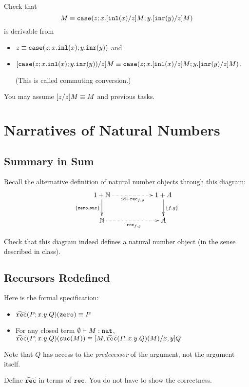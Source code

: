 \documentclass[12pt]{article}
\begin{document}
\begin{task}
  Check that
  \[
    M \equiv \mathtt{case}(z;x.[\mathtt{inl}(x)/z]M;y.[\mathtt{inr}(y)/z]M)
  \]
  is derivable from
  \begin{itemize}
    \item $z \equiv \mathtt{case}(z;x.\mathtt{inl}(x);y.\mathtt{inr}(y))$ and
    \item
      $[\mathtt{case}(z;x.\mathtt{inl}(x);y.\mathtt{inr}(y))/z]M \equiv \mathtt{case}(z;x.[\mathtt{inl}(x)/z]M;y.[\mathtt{inr}(y)/z]M)$.
      
      (This is called commuting conversion.)
  \end{itemize}
  You may assume $[z/z]M \equiv M$ and previous tasks.
\end{task}

\section{Narratives of Natural Numbers}

\subsection{Summary in Sum}

Recall the alternative definition of natural number objects
through this diagram:
\[
  \xymatrixcolsep{5pc}
  \xymatrix{
    1 + \mathbb{N} \ar@{.>}[r]_{\id + \rec_{f,g}} \ar[d]_{\copair{\zero}{\suc}}
    & 1 + A \ar[d]^{\copair{f}{g}}
    \\
    \mathbb{N} \ar@{.>}[r]_{!\,\rec_{f,g}} & A
  }
\]
\begin{task}
  Check that this diagram indeed defines a natural number object
  (in the sense described in class).
\end{task}

\subsection{Recursors Redefined}

Here is the formal specification:
\begin{itemize}
  \item $\widetilde{\mathtt{rec}}(P; x.y.Q)(\mathtt{zero}) \equiv P$
  \item For any closed term $\emptyset \vdash M : \mathtt{nat}$,\\
    $\widetilde{\mathtt{rec}}(P; x.y.Q)(\mathtt{suc}(M)) \equiv [M,\widetilde{\mathtt{rec}}(P;x.y.Q)(M)/x,y]Q$
\end{itemize}
Note that $Q$ has access to the \emph{predecessor} of the argument,
not the argument itself.

\begin{task}
  Define $\widetilde{\mathtt{rec}}$ in terms of $\mathtt{rec}$.
  You do not have to show the correctness.
\end{task}
\end{document}
